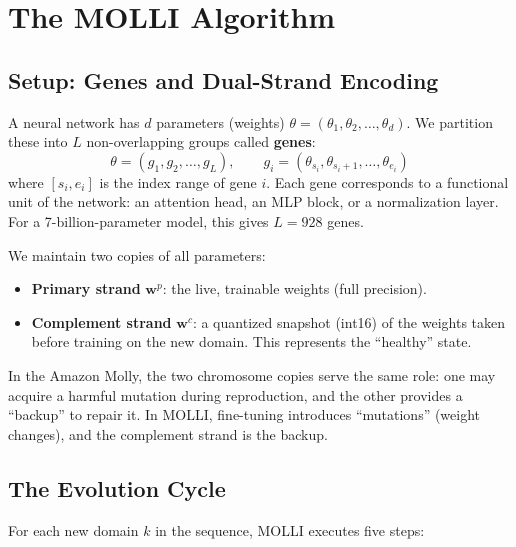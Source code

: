 \documentclass[11pt,letterpaper]{article}
\theoremstyle{definition}
\begin{document}
\section{The MOLLI Algorithm}
\label{sec:method}

\subsection{Setup: Genes and Dual-Strand Encoding}

A neural network has $d$ parameters (weights) $\theta = (\theta_1, \theta_2, \ldots, \theta_d)$. We partition these into $L$ non-overlapping groups called \textbf{genes}:
\[
\theta = (g_1, g_2, \ldots, g_L), \qquad g_i = (\theta_{s_i}, \theta_{s_i + 1}, \ldots, \theta_{e_i})
\]
where $[s_i, e_i]$ is the index range of gene $i$. Each gene corresponds to a functional unit of the network: an attention head, an MLP block, or a normalization layer. For a 7-billion-parameter model, this gives $L = 928$ genes.

We maintain two copies of all parameters:
\begin{itemize}[nosep]
  \item \textbf{Primary strand} $\mathbf{w}^p$: the live, trainable weights (full precision).
  \item \textbf{Complement strand} $\mathbf{w}^c$: a quantized snapshot (int16) of the weights taken before training on the new domain. This represents the ``healthy'' state.
\end{itemize}

\begin{tcolorbox}[defbox, title={Biological Analogy}]
In the Amazon Molly, the two chromosome copies serve the same role: one may acquire a harmful mutation during reproduction, and the other provides a ``backup'' to repair it. In MOLLI, fine-tuning introduces ``mutations'' (weight changes), and the complement strand is the backup.
\end{tcolorbox}

\subsection{The Evolution Cycle}

For each new domain $k$ in the sequence, MOLLI executes five steps:
\end{document}
